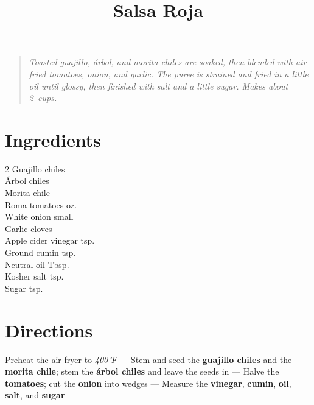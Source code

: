 \documentclass[11pt,letterpaper]{article}
\title{Salsa Roja}
\author{}
\date{}
\begin{document}
\maketitle
\thispagestyle{empty}

\begin{quote}
\textit{Toasted guajillo, árbol, and morita chiles are soaked, then blended with air-fried tomatoes, onion, and garlic. The puree is strained and fried in a little oil until glossy, then finished with salt and a little sugar. Makes about 2~cups.}
\end{quote}

\section*{Ingredients}
\setlength{\columnsep}{20pt}
\begin{multicols}{2}
\noindent
    Guajillo chiles  \\
    Árbol chiles  \\
    Morita chile  \\
    Roma tomatoes  oz. \\
    White onion \dotfill {} small \\
    \columnbreak
    Garlic cloves  \\
    Apple cider vinegar  tsp. \\
    Ground cumin \dotfill {} tsp. \\
    Neutral oil  Tbsp. \\
    Kosher salt  tsp. \\
    Sugar \dotfill {} tsp. \\
\end{multicols}

\section*{Directions}

\noindent
Preheat the air fryer to \textit{400°F} ---
Stem and seed the \textbf{guajillo chiles} and the \textbf{morita chile}; stem the \textbf{árbol chiles} and leave the seeds in ---
Halve the \textbf{tomatoes}; cut the \textbf{onion} into wedges ---
Measure the \textbf{vinegar}, \textbf{cumin}, \textbf{oil}, \textbf{salt}, and \textbf{sugar}
\end{document}
